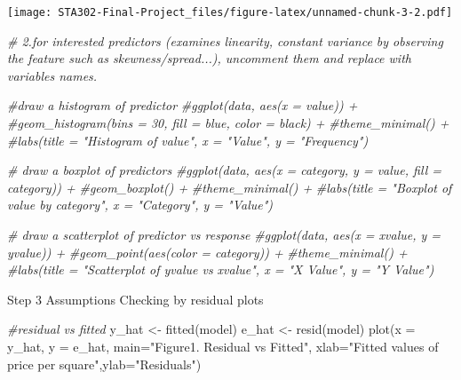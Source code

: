 \documentclass[
]{article}
\newenvironment{Shaded}{\begin{snugshade}}{\end{snugshade}}
\newcommand{\AttributeTok}[1]{\textcolor[rgb]{0.77,0.63,0.00}{#1}}
\newcommand{\CommentTok}[1]{\textcolor[rgb]{0.56,0.35,0.01}{\textit{#1}}}
\newcommand{\FunctionTok}[1]{\textcolor[rgb]{0.00,0.00,0.00}{#1}}
\newcommand{\NormalTok}[1]{#1}
\newcommand{\OtherTok}[1]{\textcolor[rgb]{0.56,0.35,0.01}{#1}}
\newcommand{\StringTok}[1]{\textcolor[rgb]{0.31,0.60,0.02}{#1}}
\begin{document}
\texttt{[image: STA302-Final-Project\_files/figure-latex/unnamed-chunk-3-2.pdf]}

\begin{Shaded}
\begin{Highlighting}[]
\CommentTok{\# 2.for interested predictors (examines linearity, constant variance by observing the feature such as skewness/spread...), uncomment them and replace with variables names.}

\CommentTok{\#draw a histogram of predictor}
\CommentTok{\#ggplot(data, aes(x = value)) + }
  \CommentTok{\#geom\_histogram(bins = 30, fill = \textquotesingle{}blue\textquotesingle{}, color = \textquotesingle{}black\textquotesingle{}) +}
  \CommentTok{\#theme\_minimal() +}
  \CommentTok{\#labs(title = "Histogram of \textquotesingle{}value\textquotesingle{}", x = "Value", y = "Frequency")}

\CommentTok{\# draw a boxplot of predictors}
\CommentTok{\#ggplot(data, aes(x = category, y = value, fill = category)) +}
  \CommentTok{\#geom\_boxplot() +}
  \CommentTok{\#theme\_minimal() +}
  \CommentTok{\#labs(title = "Boxplot of \textquotesingle{}value\textquotesingle{} by \textquotesingle{}category\textquotesingle{}", x = "Category", y = "Value")}

\CommentTok{\# draw a scatterplot of predictor vs response}
\CommentTok{\#ggplot(data, aes(x = xvalue, y = yvalue)) +}
  \CommentTok{\#geom\_point(aes(color = category)) + }
  \CommentTok{\#theme\_minimal() +}
  \CommentTok{\#labs(title = "Scatterplot of \textquotesingle{}yvalue\textquotesingle{} vs \textquotesingle{}xvalue\textquotesingle{}", x = "X Value", y = "Y Value")}
\end{Highlighting}
\end{Shaded}

Step 3 Assumptions Checking by residual plots

\begin{Shaded}
\begin{Highlighting}[]
\CommentTok{\#residual vs fitted}
\NormalTok{y\_hat }\OtherTok{\textless{}{-}} \FunctionTok{fitted}\NormalTok{(model)}
\NormalTok{e\_hat }\OtherTok{\textless{}{-}} \FunctionTok{resid}\NormalTok{(model)}
\FunctionTok{plot}\NormalTok{(}\AttributeTok{x =}\NormalTok{  y\_hat, }\AttributeTok{y =}\NormalTok{ e\_hat, }\AttributeTok{main=}\StringTok{"Figure1. Residual vs Fitted"}\NormalTok{, }\AttributeTok{xlab=}\StringTok{"Fitted values of price per square"}\NormalTok{,}\AttributeTok{ylab=}\StringTok{"Residuals"}\NormalTok{)}
\end{Highlighting}
\end{Shaded}
\end{document}

